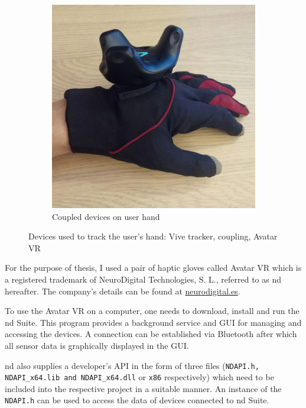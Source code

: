 \documentclass[hyperref, bachelorofscience]{cgvpub}
\begin{document}
\begin{figure}
\begin{subfigure}{.49\linewidth}
		\includegraphics[width=\linewidth]{../pics/devices_coupled}
		\caption{Coupled devices on user hand}
		\label{fig:devices:cou}
	\end{subfigure}
	\caption[Devices used to track the user's hand]{Devices used to track the user's hand: Vive tracker, coupling, Avatar VR}
	\label{fig:devices}
\end{figure}

For the purpose of thesis, I used a pair of haptic gloves called Avatar VR which is a registered trademark of NeuroDigital Technologies, S. L., referred to as \acrshort{nd} hereafter. The company's details can be found at \url{neurodigital.es}.

To use the Avatar VR on a computer, one needs to download, install and run the \acrshort{nd} Suite. This program provides a background service and GUI for managing and accessing the devices. A connection can be established via Bluetooth after which all sensor data is graphically displayed in the GUI.

\acrshort{nd} also supplies a developer's API in the form of three files (\lstinline|NDAPI.h, NDAPI_x64.lib and NDAPI_x64.dll| or \lstinline|x86| respectively) which need to be included into the respective project in a suitable manner. An instance of the \lstinline|NDAPI.h| can be used to access the data of devices connected to \acrshort{nd} Suite.
\end{document}
